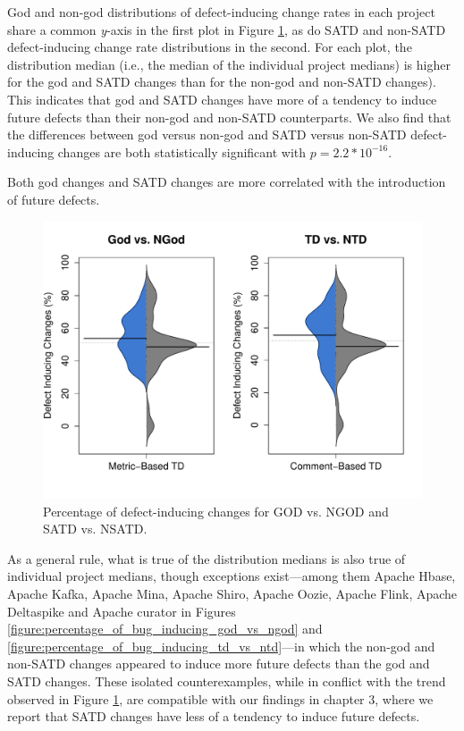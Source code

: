 

God and non-god distributions of defect-inducing change rates in each project share a common \textit{y}-axis in the first plot in Figure \ref{figure:ch4_bug_inducing_changes}, as do SATD and non-SATD defect-inducing change rate distributions in the second. For each plot, the distribution median (i.e., the median of the individual project medians) is higher for the god and SATD changes than for the non-god and non-SATD changes). This indicates that god and SATD changes have more of a tendency to induce future defects than their non-god and non-SATD counterparts. We also find that the differences between god versus non-god and SATD versus non-SATD defect-inducing changes are both statistically significant with $p=2.2\ast 10^{-16}$.


\begin{myboxii}
	Both god changes and SATD changes are more correlated with the introduction of future defects.
\end{myboxii}

\begin{figure}[h]
	\centering
	\includegraphics[width=140mm]{figures/chapter4/rq2_new}
	\caption{Percentage of defect-inducing changes for GOD vs. NGOD and SATD vs. NSATD.}
	\label{figure:ch4_bug_inducing_changes}
\end{figure}

As a general rule, what is true of the distribution medians is also true of individual project medians, though exceptions exist---among them Apache Hbase, Apache Kafka, Apache Mina, Apache Shiro, Apache Oozie, Apache Flink, Apache Deltaspike and Apache curator in Figures \ref{figure:percentage_of_bug_inducing_god_vs_ngod} and \ref{figure:percentage_of_bug_inducing_td_vs_ntd}---in which the non-god and non-SATD changes appeared to induce more future defects than the god and SATD changes. These isolated counterexamples, while in conflict with the trend observed in Figure \ref{figure:ch4_bug_inducing_changes}, are compatible with our findings in chapter 3, where we report that SATD changes have less of a tendency to induce future defects.

